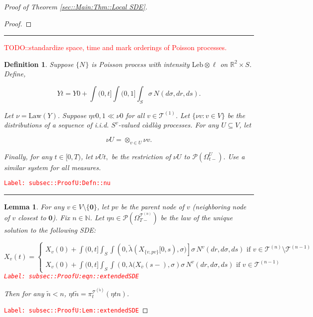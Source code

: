 \documentclass[12pt]{article}
\newcommand{\mb}{\mathbb}
\newcommand{\mc}{\mathcal}
\newcommand{\ov}{\overline}
\newcommand{\te}{\text}
\newcommand{\tr}{\textcolor{red}}
\newcommand{\labe}[1]{\tr{\texttt{Label: #1}}}
\newcommand{\lin}{\rule{\linewidth}{0.4 pt}}
\newcommand{\pmsr}{\mc{P}}							%
\renewcommand{\root}{\mathbf{0}}				%
\renewcommand{\v}{v}							%
\renewcommand{\U}{U}							%
\renewcommand{\S}{S}							%
\newcommand{\s}{\sigma}							%
\newcommand{\T}{T}								%
\renewcommand{\t}{t}							%
\newcommand{\sset}{\Omega}						%
\newcommand{\proj}{\pi}							%
\renewcommand{\tt}{s}							%
\newcommand{\X}{X}								%
\newcommand{\vind}[1]{^{#1}}					%
\newcommand{\carp}[1]{^{#1}}					%
\newcommand{\vsi}[1]{^{#1}}						%
\newcommand{\cind}[1]{_{#1}}					%
\newcommand{\cl}{\ov}							%
\newcommand{\tp}[1]{(#1)}						%
\newcommand{\tip}[1]{#1}						%
\newcommand{\ts}[1]{_{#1}}						%
\newcommand{\tree}{\mc{T}}						%
\newcommand{\sln}[1]{^{(#1)}}						%
\newcommand{\poiss}{N}							%
\newcommand{\leb}{\te{Leb}}						%
\newcommand{\Sm}{\ell}							%
\newcommand{\rate}{\lambda}						%
\renewcommand{\r}{r}							%
\newcommand{\alt}[1]{\widetilde{#1}}			%
\newcommand{\mm}{\nu}							%
\newcommand{\mmm}{\eta}							%
\newcommand{\law}{\te{Law}}						%
\newcommand{\XX}{Y}								%
\newcommand{\crate}{\alt{\lambda}}				%
\newcommand{\p}{p}								%
\newtheorem{lem}[thms]{Lemma}
\newtheorem{defn}[thms]{Definition}
\begin{document}
\begin{proof}[Proof of Theorem \ref{sec::Main:Thm::Local SDE}]
\begin{proof}
\end{proof}

\lin

\tr{TODO::standardize space, time and mark orderings of Poisson processes.}

\begin{defn}
Suppose \(\{\poiss\vind{}\}\) is Poisson process with intensity \(\leb\otimes \Sm\) on \(\mb{R}^2\times \S\). Define,

\[\XX{}{\t} = \XX{}{0} + \int{(0,\t]}\int{(0,1]}\int_\S\s\,\poiss\vind{}(d\s,d\r,d\tt).\]

Let \(\mm{}{}{} = \law(\XX{}{})\). Suppose \(\mmm{\v}{0,}{1}\ll\mm{}{0}{}\) for all \(\v\in\tree\sln{1}\). Let \(\{\mm{\v}{}{}:\v\in V\}\) be the distributions of a sequence of i.i.d. \(\S\carp{\v}\)-valued c\`adl\`ag processes. For any \(\U\subseteq V\), let 

\[\mm{\U}{}{} = \otimes_{\v\in\U} \mm{\v}{}{}.\]

Finally, for any \(\t\in [0,\T)\), let \(\mm{\U}{\t,}{}\) be the restriction of \(\mm{\U}{}{}\) to \(\pmsr(\sset\vsi{\U}\ts{\t-})\). Use a similar system for all measures.
\label{subsec::ProofU:Defn::nu}
\end{defn}
\labe{subsec::ProofU:Defn::nu}

\lin

\begin{lem}
For any \(\v \in V\setminus\{\root\}\), let \(\p{\v}\) be the parent node of \(\v\) (neighboring node of \(\v\) closest to \(\root\)). Fix \(n \in \mb{N}\). Let \(\mmm{}{}{n} \in \pmsr\left(\sset\vsi{\tree\sln{n}}\ts{\T-}\right)\) be the law of the unique solution to the following SDE:

\begin{equation}
\X\cind{\v}\tp{\t} = \begin{cases}
\X\cind{\v}\tp{0} + \int{(0,\t]}\int_\S\int{\left(0,\crate{}{}(\X\cind{\{\v,\p{\v}\}}\tip{[0,\tt)},\s)\right]}\s\,\poiss\vind{\v}(d\r,d\s,d\tt)\te{ if } \v \in \tree\sln{n}\setminus \tree\sln{n-1}\\
\X\cind{\v}\tp{0} + \int{(0,\t]}\int_\S\int{\left(0,\rate{}(\X\cind{\cl{\v}}\tp{\tt-},\s\right)}\s\,\poiss\vind{\v}(d\r,d\s,d\tt)\te{ if } \v \in \tree\sln{n-1}
\end{cases}
\label{subsec::ProofU:eqn::extendedSDE}
\end{equation}
\labe{subsec::ProofU:eqn::extendedSDE}

Then for any \(\alt{n} < n\), \(\mmm{}{\t}{\alt{n}} = \proj\vsi{\tree\sln{\alt{n}}}\ts{\t}(\mmm{}{\t}{n})\).
\label{subsec::ProofU:Lem::extendedSDE}
\end{lem}
\labe{subsec::ProofU:Lem::extendedSDE}


\end{proof}
\end{document}
